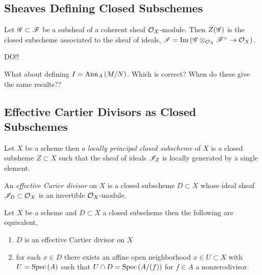 \documentclass[12pt]{article}
\begin{document}
\subsection{Sheaves Defining Closed Subschemes}

\begin{defn}
Let $\mathscr{G} \subset \mathscr{F}$ be a subsheaf of a coherent sheaf $\mathcal{O}_{X}$-module. Then $Z(\mathscr{G})$ is the closed subscheme associated to the sheaf of ideals, $\mathscr{I} = \mathrm{Im}\left( \mathscr{G} \otimes_{\mathcal{O}_{X}} \mathscr{F}^\vee \to \mathcal{O}_{X} \right)$.
\end{defn}

DO!!

What about defining $I = \mathrm{Ann}_{A}\left(M/N\right)$. Which is correct? When do these give the same results??

\subsection{Effective Cartier Divisors as Closed Subschemes}

\begin{definition}
Let $X$ be a scheme then \textit{a locally principal closed subscheme} of $X$ is a closed subsheme $Z \subset X$ such that the sheaf of ideals $\mathscr{I}_Z$ is locally generated by a single element. 
\end{definition}

\begin{definition}
An \textit{effective Carier divisor} on $X$ is a closed subscheme $D \subset X$ whose ideal sheaf $\mathscr{I}_D \subset \mathcal{O}_{X}$ is an invertible $\mathcal{O}_{X}$-module. 
\end{definition}

\begin{definition}
Let $X$ be a scheme and $D \subset X$ a closed subscheme then the following are equivalent,
\begin{enumerate}
\item $D$ is an effective Cartier divisor on $X$
\item for each $x \in D$ there exists an affine open neighborhood $x \in U \subset X$ with $U = \mathrm{Spec}\left( A \right)$ such that $U \cap D = \mathrm{Spec}\left( A / (f) \right)$ for $f \in A$ a nonzerodivisor. 
\end{enumerate}
\end{definition}
\end{document}
